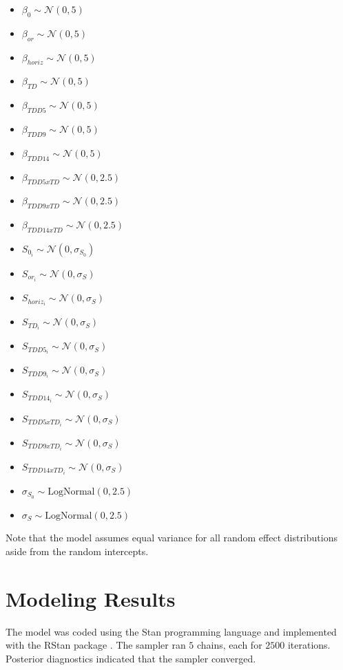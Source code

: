 \begin{itemize}
    \item $\beta_{0} \sim \mathcal{N}(0,5)$
    \item $\beta_{or} \sim \mathcal{N}(0,5)$
    \item $\beta_{horiz} \sim \mathcal{N}(0,5)$
    \item $\beta_{TD} \sim \mathcal{N}(0,5)$
    \item $\beta_{TDD5} \sim \mathcal{N}(0,5)$
    \item $\beta_{TDD9} \sim \mathcal{N}(0,5)$
    \item $\beta_{TDD14} \sim \mathcal{N}(0,5)$
    \item $\beta_{TDD5xTD} \sim \mathcal{N}(0,2.5)$
    \item $\beta_{TDD9xTD} \sim \mathcal{N}(0,2.5)$
    \item $\beta_{TDD14xTD} \sim \mathcal{N}(0,2.5)$
    \item $S_{0_{i}} \sim \mathcal{N}(0, \sigma_{S_0})$
    \item $S_{or_{i}} \sim \mathcal{N}(0, \sigma_{S})$
    \item $S_{horiz_{i}} \sim \mathcal{N}(0, \sigma_{S})$
    \item $S_{TD_{i}} \sim \mathcal{N}(0, \sigma_{S})$
    \item $S_{TDD5_{i}} \sim \mathcal{N}(0, \sigma_{S})$
    \item $S_{TDD9_{i}} \sim \mathcal{N}(0, \sigma_{S})$
    \item $S_{TDD14_{i}} \sim \mathcal{N}(0, \sigma_{S})$
    \item $S_{TDD5xTD_{i}} \sim \mathcal{N}(0, \sigma_{S})$
    \item $S_{TDD9xTD_{i}} \sim \mathcal{N}(0, \sigma_{S})$
    \item $S_{TDD14xTD_{i}} \sim \mathcal{N}(0, \sigma_{S})$
    \item $\sigma_{S_{0}} \sim \text{LogNormal}(0,2.5)$
    \item $\sigma_{S} \sim \text{LogNormal}(0,2.5)$
\end{itemize}

Note that the model assumes equal variance for all random effect distributions aside from the random intercepts.

\section{Modeling Results}
The model was coded using the Stan programming language \parencite{carpenter2017stan} and implemented with the RStan package \parencite{rstan}. The sampler ran $5$ chains, each for $2500$ iterations. Posterior diagnostics indicated that the sampler converged.

